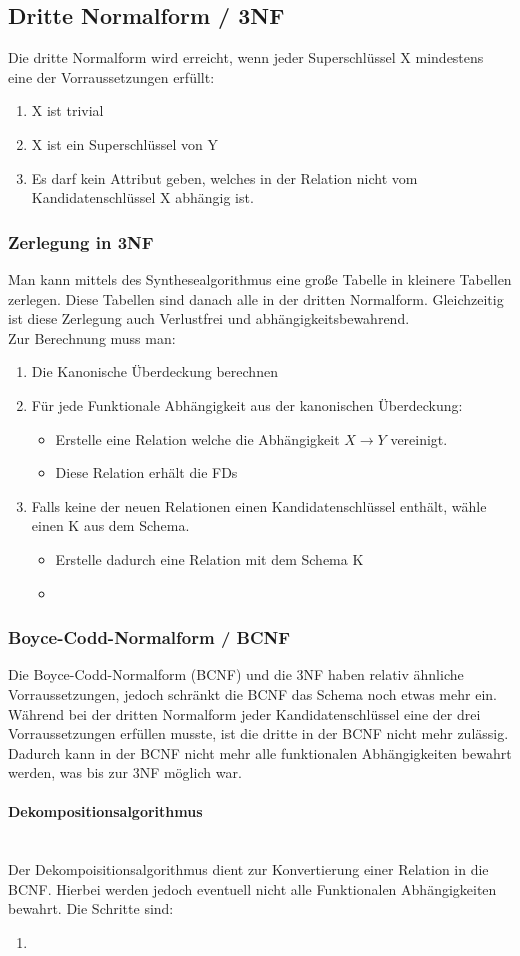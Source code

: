 \documentclass{article}
\newcommand{\paragraphlb}[1]{\paragraph{#1}\mbox{}\\}
\begin{document}
	\subsection{Dritte Normalform / 3NF}
	Die dritte Normalform wird erreicht, wenn jeder Superschlüssel X mindestens eine der Vorraussetzungen erfüllt: 
	\begin{enumerate}
		\item{X ist trivial}
		\item{X ist ein Superschlüssel von Y}
		\item{Es darf kein Attribut geben, welches in der Relation nicht vom Kandidatenschlüssel X abhängig ist.}
	\end{enumerate}

	\subsubsection{Zerlegung in 3NF}
	Man kann mittels des Synthesealgorithmus eine große Tabelle in kleinere Tabellen zerlegen. Diese Tabellen sind danach alle in der dritten Normalform. Gleichzeitig ist diese Zerlegung auch Verlustfrei und abhängigkeitsbewahrend. \\
	Zur Berechnung muss man:
	\begin{enumerate}
		\item{Die Kanonische Überdeckung berechnen}
		\item{Für jede Funktionale Abhängigkeit aus der kanonischen Überdeckung:}
		\begin{itemize}
			\item{Erstelle eine Relation welche die Abhängigkeit $X \to Y$ vereinigt.}
			\item{Diese Relation erhält die FDs}
		\end{itemize}
		\item{Falls keine der neuen Relationen einen Kandidatenschlüssel enthält, wähle einen K aus dem Schema.}
		\begin{itemize}
			\item{Erstelle dadurch eine Relation mit dem Schema K}
			\item{}
		\end{itemize}
	\end{enumerate}
	\subsubsection{Boyce-Codd-Normalform / BCNF}
	Die Boyce-Codd-Normalform (BCNF) und die 3NF haben relativ ähnliche Vorraussetzungen, jedoch schränkt die BCNF das Schema noch etwas mehr ein. Während bei der dritten Normalform jeder Kandidatenschlüssel eine der drei Vorraussetzungen erfüllen musste, ist die dritte in der BCNF nicht mehr zulässig. Dadurch kann in der BCNF nicht mehr alle funktionalen Abhängigkeiten bewahrt werden, was bis zur 3NF möglich war.
	\paragraphlb{Dekompositionsalgorithmus}
	Der Dekompoisitionsalgorithmus dient zur Konvertierung einer Relation in die BCNF. Hierbei werden jedoch eventuell nicht alle Funktionalen Abhängigkeiten bewahrt. Die Schritte sind:
	\begin{enumerate}
		\item{}
	\end{enumerate}
\end{document}
